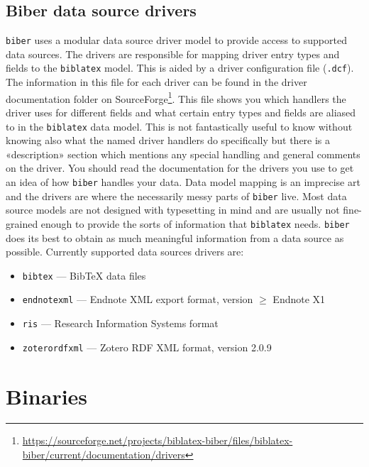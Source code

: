 \documentclass{ltxdockit}
\begin{document}
\subsection{Biber data source drivers}\label{dcf}

\verb+biber+ uses a modular data source driver model to provide access
to supported data sources. The drivers are responsible for mapping
driver entry types and fields to the \verb+biblatex+ model. This is
aided by a driver configuration file (\verb+.dcf+). The information in
this file for each driver can be found in the driver documentation folder on
SourceForge\footnote{\url{https://sourceforge.net/projects/biblatex-biber/files/biblatex-biber/current/documentation/drivers}}. This
file shows you which handlers the driver uses for different fields and
what certain entry types and fields are aliased to in the
\verb+biblatex+ data model. This is not fantastically useful to know
without knowing also what the named driver handlers do specifically but there
is a «description» section which mentions any special handling and
general comments on the driver. You should read the documentation for
the drivers you use to get an idea of how \verb+biber+ handles your
data. Data model mapping is an imprecise art
and the drivers are where the necessarily messy parts of \verb+biber+
live. Most data source models are not designed with typesetting in
mind and are usually not fine-grained enough to provide the sorts of
information that \verb+biblatex+ needs. \verb+biber+ does its best to
obtain as much meaningful information from a data source as possible.
Currently supported data sources drivers are:

\begin{itemize}
\item \verb+bibtex+ --- BibTeX data files
\item \verb+endnotexml+ --- Endnote XML export format, version $\geq$ Endnote X1
\item \verb+ris+ --- Research Information Systems format
\item \verb+zoterordfxml+ --- Zotero RDF XML format, version 2.0.9
\end{itemize}

\section{Binaries}\label{binaries}
\end{document}
